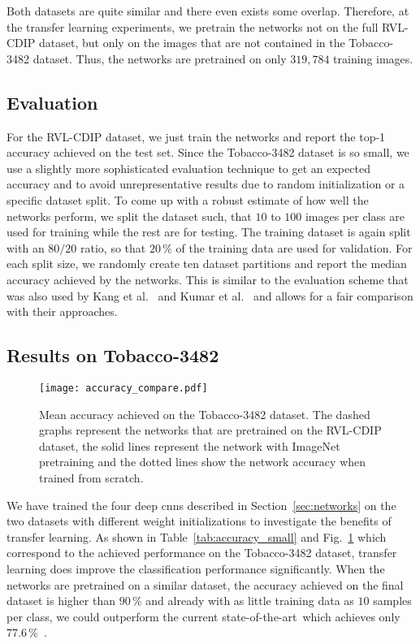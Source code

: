 \documentclass[conference]{IEEEtran}
\newcommand*{\sota}		{state-of-the-art\ }
\begin{document}
Both datasets are quite similar and there even exists some overlap. Therefore, at the transfer learning experiments, we pretrain the networks not on the full RVL-CDIP dataset, but only on the images that are not contained in the Tobacco-3482 dataset. Thus, the networks are pretrained on only $319,784$ training images.




\subsection{Evaluation}

For the RVL-CDIP dataset, we just train the networks and report the top-1 accuracy achieved on the test set. Since the Tobacco-3482 dataset is so small, we use a slightly more sophisticated evaluation technique to get an expected accuracy and to avoid unrepresentative results due to random initialization or a specific dataset split. To come up with a robust estimate of how well the networks perform, we split the dataset such, that $10$ to $100$ images per class are used for training while the rest are for testing. The training dataset is again split with an $80/20$ ratio, so that $20\,\%$ of the training data are used for validation. For each split size, we randomly create ten dataset partitions and report the median accuracy achieved by the networks.
This is similar to the evaluation scheme that was also used by Kang et al.~\cite{lekang_14_a} and Kumar et al.~\cite{doclass_Kumar14} and allows for a fair comparison with their approaches.


\subsection{Results on Tobacco-3482}

\begin{figure}
        \centering
        \texttt{[image: accuracy\_compare.pdf]}
        \caption{Mean accuracy achieved on the Tobacco-3482 dataset. The dashed graphs represent the networks that are pretrained on the RVL-CDIP dataset, the solid lines represent the network with ImageNet pretraining and the dotted lines show the network accuracy when trained from scratch.}
\label{fig:accuracy}
\end{figure}



We have trained the four deep \ac{cnn}s described in Section~\ref{sec:networks} on the two datasets with different weight initializations to investigate the benefits of transfer learning. As shown in Table~\ref{tab:accuracy_small} and Fig.~\ref{fig:accuracy} which correspond to the achieved performance on the Tobacco-3482 dataset, transfer learning does improve the classification performance significantly. When the networks are pretrained on a similar dataset, the accuracy achieved on the final dataset is higher than $90\,\%$ and already with as little training data as $10$ samples per class, we could outperform the current \sota which achieves only $77.6\,\%$~\cite{afzal2015deepdocclassifier}.
\end{document}
